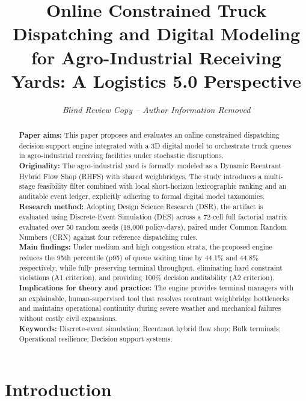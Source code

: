 \documentclass[12pt,a4paper]{article}
\title{\textbf{Online Constrained Truck Dispatching and Digital Modeling for Agro-Industrial Receiving Yards: A Logistics 5.0 Perspective}}
\author{\textit{Blind Review Copy -- Author Information Removed}}
\date{}
\begin{document}
\maketitle

\begin{abstract}
\noindent\textbf{Paper aims:} This paper proposes and evaluates an online constrained dispatching decision-support engine integrated with a 3D digital model to orchestrate truck queues in agro-industrial receiving facilities under stochastic disruptions.\\
\textbf{Originality:} The agro-industrial yard is formally modeled as a Dynamic Reentrant Hybrid Flow Shop (RHFS) with shared weighbridges. The study introduces a multi-stage feasibility filter combined with local short-horizon lexicographic ranking and an auditable event ledger, explicitly adhering to formal digital model taxonomies.\\
\textbf{Research method:} Adopting Design Science Research (DSR), the artifact is evaluated using Discrete-Event Simulation (DES) across a 72-cell full factorial matrix evaluated over 50 random seeds (18,000 policy-days), paired under Common Random Numbers (CRN) against four reference dispatching rules.\\
\textbf{Main findings:} Under medium and high congestion strata, the proposed engine reduces the 95th percentile (p95) of queue waiting time by 44.1\% and 44.8\% respectively, while fully preserving terminal throughput, eliminating hard constraint violations (A1 criterion), and providing 100\% decision auditability (A2 criterion).\\
\textbf{Implications for theory and practice:} The engine provides terminal managers with an explainable, human-supervised tool that resolves reentrant weighbridge bottlenecks and maintains operational continuity during severe weather and mechanical failures without costly civil expansions.\\
\vspace{0.5em}
\noindent\textbf{Keywords:} Discrete-event simulation; Reentrant hybrid flow shop; Bulk terminals; Operational resilience; Decision support systems.
\end{abstract}

\section{Introduction}
\label{sec:introduction}
\end{document}
